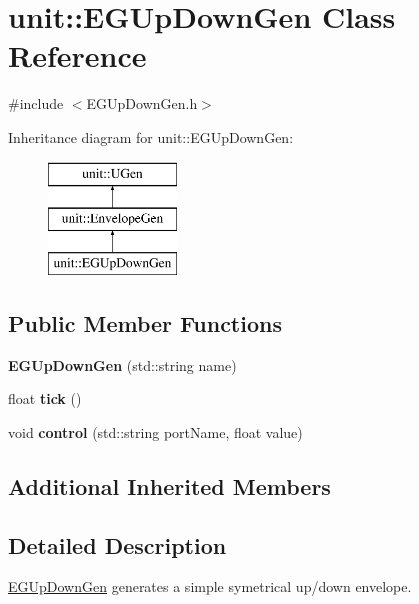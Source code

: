\hypertarget{classunit_1_1EGUpDownGen}{\section{unit\-:\-:E\-G\-Up\-Down\-Gen Class Reference}
\label{classunit_1_1EGUpDownGen}
}


{\ttfamily \#include $<$E\-G\-Up\-Down\-Gen.\-h$>$}

Inheritance diagram for unit\-:\-:E\-G\-Up\-Down\-Gen\-:\begin{figure}[H]
\begin{center}
\leavevmode
\includegraphics[height=3.000000cm]{classunit_1_1EGUpDownGen}
\end{center}
\end{figure}
\subsection*{Public Member Functions}
\begin{DoxyCompactItemize}
\item 
\hypertarget{classunit_1_1EGUpDownGen_abc35a572da36fa26f4b54beabfc6268e}{{\bfseries E\-G\-Up\-Down\-Gen} (std\-::string name)}\label{classunit_1_1EGUpDownGen_abc35a572da36fa26f4b54beabfc6268e}

\item 
\hypertarget{classunit_1_1EGUpDownGen_abea11de5389345064a8395d54411e3b3}{float {\bfseries tick} ()}\label{classunit_1_1EGUpDownGen_abea11de5389345064a8395d54411e3b3}

\item 
\hypertarget{classunit_1_1EGUpDownGen_ac1ef59d9023034c17b46e09bfae15178}{void {\bfseries control} (std\-::string port\-Name, float value)}\label{classunit_1_1EGUpDownGen_ac1ef59d9023034c17b46e09bfae15178}

\end{DoxyCompactItemize}
\subsection*{Additional Inherited Members}


\subsection{Detailed Description}
\hyperlink{classunit_1_1EGUpDownGen}{E\-G\-Up\-Down\-Gen} generates a simple symetrical up/down envelope.

